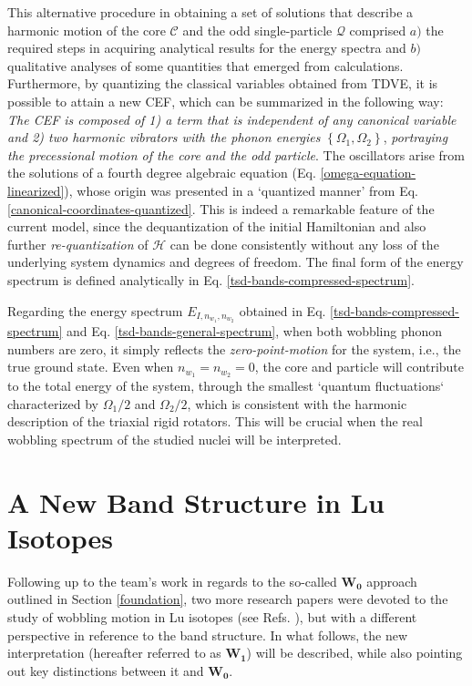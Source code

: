 This alternative procedure in obtaining a set of solutions that describe a harmonic motion of the core $\mathscr{C}$ and the odd single-particle $\mathcal{Q}$ comprised $a)$ the required steps in acquiring analytical results for the energy spectra and $b)$ qualitative analyses of some quantities that emerged from calculations. Furthermore, by quantizing the classical variables obtained from TDVE, it is possible to attain a new CEF, which can be summarized in the following way: \emph{The CEF is composed of 1) a term that is independent of any canonical variable and 2) two harmonic vibrators with the phonon energies} $\left\{\Omega_1,\Omega_2\right\}$, \emph{portraying the precessional motion of the core and the odd particle}. The oscillators arise from the solutions of a fourth degree algebraic equation (Eq. \ref{omega-equation-linearized}), whose origin was presented in a `quantized manner' from Eq. \ref{canonical-coordinates-quantized}. This is indeed a remarkable feature of the current model, since the dequantization of the initial Hamiltonian and also further \emph{re-quantization} of $\mathcal{H}$ can be done consistently without any loss of the underlying system dynamics and degrees of freedom. The final form of the energy spectrum is defined analytically in Eq. \ref{tsd-bands-compressed-spectrum}. %

Regarding the energy spectrum $E_{I,n_{w_1},n_{w_2}}$ obtained in Eq. \ref{tsd-bands-compressed-spectrum} and Eq. \ref{tsd-bands-general-spectrum}, when both wobbling phonon numbers are zero, it simply reflects the \emph{zero-point-motion} for the system, i.e., the true ground state. Even when $n_{w_1}=n_{w_2}=0$, the core and particle will contribute to the total energy of the system, through the smallest `quantum fluctuations` characterized by $\Omega_1/2$ and $\Omega_2/2$, which is consistent with the harmonic description of the triaxial rigid rotators. This will be crucial when the real wobbling spectrum of the studied nuclei will be interpreted.

\section{A New Band Structure in Lu Isotopes}

Following up to the team's work in regards to the so-called $\mathbf{W_0}$ approach outlined in Section \ref{foundation}, two more research papers were devoted to the study of wobbling motion in Lu isotopes (see Refs. \cite{raduta2020approach,raduta2020towards}), but with a different perspective in reference to the band structure. In what follows, the new interpretation (hereafter referred to as $\mathbf{W_1}$) will be described, while also pointing out key distinctions between it and $\mathbf{W_0}$.

